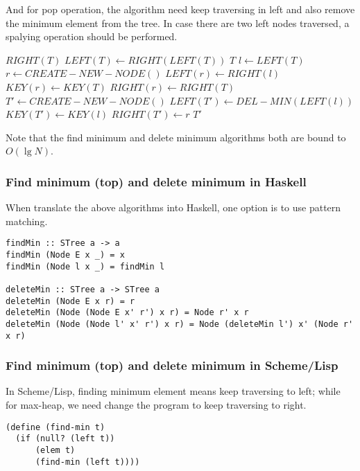 \documentclass{article}
\begin{document}
And for pop operation, the algorithm need keep traversing in left
and also remove the minimum element from the tree. In case there
are two left nodes traversed, a spalying operation should be performed.

\begin{algorithmic}[1]
    \State \Return $RIGHT(T)$
    \State $LEFT(T) \gets RIGHT(LEFT(T))$
    \State \Return $T$
  \Else
    \State $l \gets LEFT(T)$
    \State $r \gets CREATE-NEW-NODE()$
    \State $LEFT(r) \gets RIGHT(l)$
    \State $KEY(r) \gets KEY(T)$
    \State $RIGHT(r) \gets RIGHT(T)$
    \State $T' \gets CREATE-NEW-NODE()$
    \State $LEFT(T') \gets DEL-MIN(LEFT(l))$
    \State $KEY(T') \gets KEY(l)$
    \State $RIGHT(T') \gets r$
    \State \Return $T'$
  \EndIf
\EndFunction
\end{algorithmic}

Note that the find minimum and delete minimum algorithms both are
bound to $O(\lg N)$.

\subsubsection*{Find minimum (top) and delete minimum in Haskell}

When translate the above algorithms into Haskell, one option is to
use pattern matching.

\lstset{language=Haskell}
\begin{lstlisting}
findMin :: STree a -> a
findMin (Node E x _) = x
findMin (Node l x _) = findMin l

deleteMin :: STree a -> STree a
deleteMin (Node E x r) = r
deleteMin (Node (Node E x' r') x r) = Node r' x r
deleteMin (Node (Node l' x' r') x r) = Node (deleteMin l') x' (Node r' x r)
\end{lstlisting}

\subsubsection*{Find minimum (top) and delete minimum in Scheme/Lisp}

In Scheme/Lisp, finding minimum element means keep traversing to left;
while for max-heap, we need change the program to keep traversing to
right.

\lstset{language=lisp}
\begin{lstlisting}
(define (find-min t)
  (if (null? (left t)) 
      (elem t)
      (find-min (left t))))
\end{lstlisting}
\end{document}
